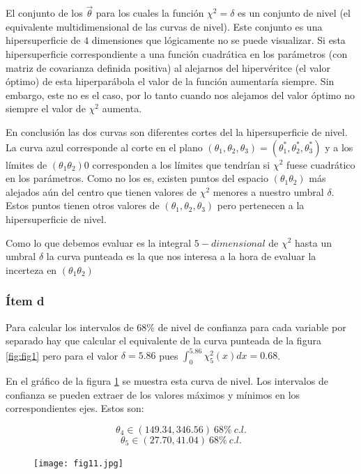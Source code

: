 El conjunto de los $\vec \theta$ para los cuales la función $\chi^2=\delta$ es un conjunto de nivel (el equivalente multidimensional de las curvas de nivel).
Este conjunto es una hipersuperficie de $4$ dimensiones que lógicamente no se puede visualizar.
Si esta hipersuperficie correspondiente a una función cuadrática en los parámetros (con matriz de covarianza definida positiva) al alejarnos del hipervéritce (el valor óptimo) de esta hiperparábola el valor de la función aumentaría siempre.
Sin embargo, este no es el caso, por lo tanto cuando nos alejamos del valor óptimo no siempre el valor de $\chi^2$ aumenta.

En conclusión las dos curvas son diferentes cortes del la hipersuperficie de nivel.
La curva azul corresponde al corte en el plano  $(\theta_1, \theta_2, \theta_3)=(\theta_1^*, \theta_2^*, \theta_3^*)$ y a los límites de $(\theta_1 \theta_2)$0 corresponden a los límites que tendrían si $\chi^2$ fuese cuadrático en los parámetros.
Como no los es, existen puntos del espacio $(\theta_1 \theta_2)$ más alejados aún del centro que tienen valores de $\chi^2$ menores a nuestro umbral $\delta$.
Estos puntos tienen otros valores de $(\theta_1, \theta_2, \theta_3)$ pero pertenecen a la hipersuperficie de nivel.

Como lo que debemos evaluar es la integral $5-dimensional$ de $\chi^2$ hasta un umbral $\delta$ la curva punteada es la que nos interesa a la hora de evaluar la incerteza en $(\theta_1 \theta_2)$

\subsubsection*{Ítem d}
Para calcular los intervalos de $68\%$ de nivel de confianza para cada variable por separado hay que calcular el equivalente de la curva punteada de la figura \ref{fig:fig1} pero para el valor $\delta=5.86$ pues $\int_0^{5.86}\chi^2_5(x)dx=0.68$.

En el gráfico de la figura \ref{fig:fig11} se muestra esta curva de nivel.
Los intervalos de confianza se pueden extraer de los valores máximos y mínimos en los correspondientes ejes.
Estos son:

$$
\theta_4 \in (149.34, 346.56)\ 68\%\ c.l.
$$
$$
\theta_5 \in (27.70, 41.04) \ 68\%\ c.l.
$$

\begin{figure}
\centering
\texttt{[image: fig11.jpg]}
\caption[]{}
\label{fig:fig11}
\end{figure}


